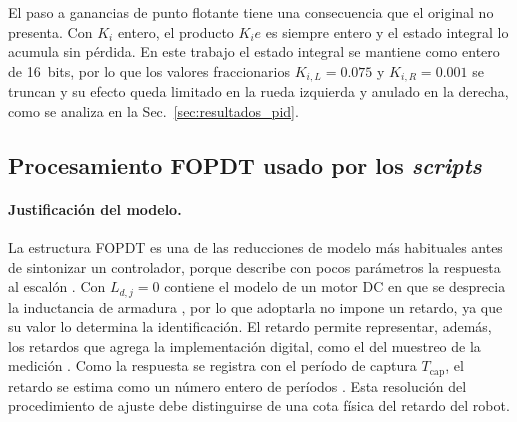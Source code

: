 \begin{appendices}
El paso a ganancias de punto flotante tiene una consecuencia que el original
no presenta. Con $K_i$ entero, el producto $K_i e$ es siempre entero y el
estado integral lo acumula sin pérdida. En este trabajo el estado integral se
mantiene como entero de 16~bits, por lo que los valores fraccionarios
$K_{i,L}=0.075$ y $K_{i,R}=0.001$ se truncan y su efecto queda limitado en la
rueda izquierda y anulado en la derecha, como se analiza en la
Sec.~\ref{sec:resultados_pid}.

\subsection{Procesamiento FOPDT usado por los \texorpdfstring{\textit{scripts}}{scripts}}
\label{anx:fodt_scripts}

\paragraph{Justificación del modelo.} La estructura FOPDT es una de las
reducciones de modelo más habituales antes de sintonizar un controlador, porque
describe con pocos parámetros la respuesta al escalón \citep{maxim2023fopdt}.
Con $L_{d,j}=0$ contiene el modelo de un motor DC en que se desprecia la
inductancia de armadura \citep{iqbal2023electromechanical}, por lo que
adoptarla no impone un retardo, ya que su valor lo determina la identificación.
El retardo permite representar, además, los retardos que agrega la
implementación digital, como el del muestreo de la medición
\citep[Sec.~13.3]{astrom2009controlpid}. Como la respuesta se registra con el
período de captura $T_{\mathrm{cap}}$, el retardo se estima como un número
entero de períodos \citep[Sec.~2.4]{maxim2023fopdt}. Esta resolución del
procedimiento de ajuste debe distinguirse de una cota física del retardo del
robot.


\end{appendices}
